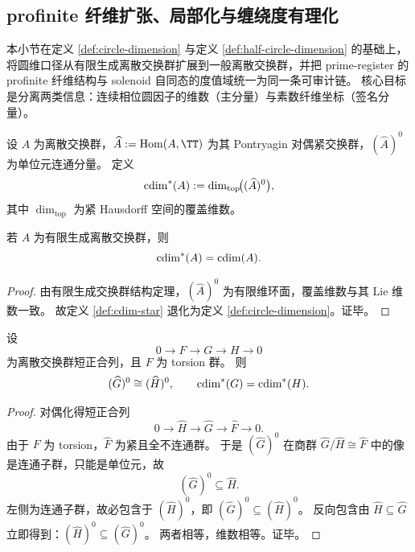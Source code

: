 \subsection{profinite 纤维扩张、局部化与缠绕度有理化}\label{subsec:cdim-profinite-fiber-localization-rational-winding}
本小节在定义 \ref{def:circle-dimension} 与定义 \ref{def:half-circle-dimension} 的基础上，将圆维口径从有限生成离散交换群扩展到一般离散交换群，并把 prime-register 的 profinite 纤维结构与 solenoid 自同态的度值域统一为同一条可审计链。
核心目标是分离两类信息：连续相位圆因子的维数（主分量）与素数纤维坐标（签名分量）。

\begin{definition}[扩展圆维]\label{def:cdim-star}
设 \(A\) 为离散交换群，\(\widehat A:=\operatorname{Hom}(A,\TT)\) 为其 Pontryagin 对偶紧交换群，\((\widehat A)^0\) 为单位元连通分量。
定义
\[
\operatorname{cdim}^\ast(A):=\dim_{\mathrm{top}}\!\bigl((\widehat A)^0\bigr),
\]
其中 \(\dim_{\mathrm{top}}\) 为紧 Hausdorff 空间的覆盖维数。
\end{definition}

\begin{proposition}[与有限生成口径的一致性]\label{prop:cdim-star-compatible-fg}
若 \(A\) 为有限生成离散交换群，则
\[
\operatorname{cdim}^\ast(A)=\operatorname{cdim}(A).
\]
\end{proposition}
\begin{proof}
由有限生成交换群结构定理，\((\widehat A)^0\) 为有限维环面，覆盖维数与其 Lie 维数一致。
故定义 \ref{def:cdim-star} 退化为定义 \ref{def:circle-dimension}。证毕。
\end{proof}

\begin{theorem}\label{thm:cdim-star-torsion-fiber-invariance}
设
\[
0\longrightarrow F\longrightarrow G\longrightarrow H\longrightarrow 0
\]
为离散交换群短正合列，且 \(F\) 为 torsion 群。
则
\[
(\widehat G)^0\cong (\widehat H)^0,
\qquad
\operatorname{cdim}^\ast(G)=\operatorname{cdim}^\ast(H).
\]
\end{theorem}
\begin{proof}
对偶化得短正合列
\[
0\longrightarrow \widehat H\longrightarrow \widehat G\longrightarrow \widehat F\longrightarrow 0.
\]
由于 \(F\) 为 torsion，\(\widehat F\) 为紧且全不连通群。
于是 \((\widehat G)^0\) 在商群 \(\widehat G/\widehat H\cong \widehat F\) 中的像是连通子群，只能是单位元，故
\[
(\widehat G)^0\subseteq \widehat H.
\]
左侧为连通子群，故必包含于 \((\widehat H)^0\)，即 \((\widehat G)^0\subseteq (\widehat H)^0\)。
反向包含由 \(\widehat H\subseteq \widehat G\) 立即得到：\((\widehat H)^0\subseteq (\widehat G)^0\)。
两者相等，维数相等。证毕。
\end{proof}

